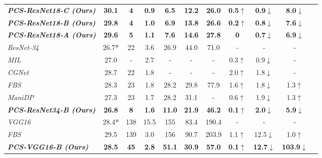 \documentclass[lettersize,journal]{IEEEtran}
\begin{document}
\begin{table*}[t]
\begin{center}
{\begin{tabular}{lcccccccccc}
        \textit{\textbf{PCS-ResNet18-C (Ours)}}&\textbf{30.1}&\textbf{4}&\textbf{0.9}&\textbf{6.5}&\textbf{12.2}&\textbf{26.0}&\textbf{0.5}$\uparrow$&\textbf{0.9}$\downarrow$&\textbf{8.0}$\downarrow$\\
        \textit{\textbf{PCS-ResNet18-B (Ours)} }&\textbf{29.8}&\textbf{4}&\textbf{1.0}&\textbf{6.9}&\textbf{13.8}&\textbf{26.6}&\textbf{0.2}$\uparrow$&\textbf{0.8}$\downarrow$&\textbf{7.6}$\downarrow$\\
        \textit{\textbf{PCS-ResNet18-A (Ours)}}&\textbf{29.6}&\textbf{5}&\textbf{1.1}&\textbf{7.6}&\textbf{14.6}&\textbf{27.8}&\textbf{0}&\textbf{0.7}$\downarrow$&\textbf{6.9}$\downarrow$\\
        \hline
        \textit{ResNet-34}~\cite{he2016deep}&26.7*&22&3.6&26.9&44.0&71.0&-&-&-\\
    \textit{MIL}~\cite{dong2017more}&27.0&-&2.7&-&-&-&0.3$\uparrow$&0.9$\downarrow$&-\\
    \textit{CGNet}~\cite{hua2018channel}&28.7&22&1.8&-&-&-&2.0$\uparrow$&1.8$\downarrow$&-\\
    \textit{FBS}~\cite{gao2018dynamic}&28.3&23&1.8&28.2&29.8&77.9&1.6$\uparrow$&1.8$\downarrow$&1.3$\uparrow$\\
    \textit{ManiDP}~\cite{tang2021manifold}&27.3&23&1.7&28.2&31.1&-&0.6$\uparrow$&1.9$\downarrow$&1.3$\uparrow$\\
        \textit{\textbf{PCS-ResNet34-B (Ours)}}&\textbf{26.8}&\textbf{8}&\textbf{1.6}&\textbf{11.0}&\textbf{21.9}&\textbf{46.2}&\textbf{0.1}$\uparrow$&\textbf{2.0}$\downarrow$&\textbf{5.9}$\downarrow$\\
        \hline
        \textit{VGG16}~\cite{simonyan2014very}&28.4*&138&15.5&155&83.4&190.4&-&-&-\\
        \textit{FBS}~\cite{gao2018dynamic}&29.5&139&3.0&156&90.7&203.9&1.1$\uparrow$&12.5$\downarrow$&1.0$\uparrow$\\
        \textit{\textbf{PCS-VGG16-B (Ours)}}&\textbf{28.5}&\textbf{45}&\textbf{2.8}&\textbf{51.1}&\textbf{30.9}&\textbf{57.0}&\textbf{0.1}$\uparrow$&\textbf{12.7}$\downarrow$&\textbf{103.9}$\downarrow$\\
        \bottomrule
     \end{tabular}
     }
  \end{center}
\end{table*}
\end{document}
